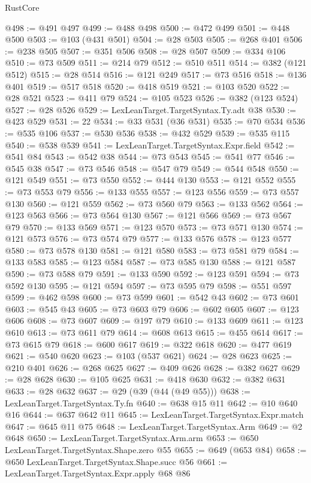 \begin{lexlean}{RustCore}
\begin{coremodule}
@498 := @491 @497
@499 := @488 @498
@500 := @472 @499
@501 := @448 @500
@503 := @103 (@431 @501)
@504 := @28 @503
@505 := @268 @401
@506 := @238 @505
@507 := @351 @506
@508 := @28 @507
@509 := @334 @106
@510 := @73 @509
@511 := @214 @79
@512 := @510 @511
@514 := @382 (@121 @512)
@515 := @28 @514
@516 := @121 @249
@517 := @73 @516
@518 := @136 @401
@519 := @517 @518
@520 := @418 @519
@521 := @103 @520
@522 := @28 @521
@523 := @411 @79
@524 := @105 @523
@526 := @382 (@123 @524)
@527 := @28 @526
@529 := LexLeanTarget.TargetSyntax.Ty.adt @38
@530 := @423 @529
@531 := 22
@534 := @33 @531 (@36 @531)
@535 := @70 @534
@536 := @535 @106
@537 := @530 @536
@538 := @432 @529
@539 := @535 @115
@540 := @538 @539
@541 := LexLeanTarget.TargetSyntax.Expr.field
@542 := @541 @84
@543 := @542 @38
@544 := @73 @543
@545 := @541 @77
@546 := @545 @38
@547 := @73 @546
@548 := @547 @79
@549 := @544 @548
@550 := @121 @549
@551 := @73 @550
@552 := @444 @130
@553 := @121 @552
@555 := @73 @553 @79
@556 := @133 @555
@557 := @123 @556
@559 := @73 @557 @130
@560 := @121 @559
@562 := @73 @560 @79
@563 := @133 @562
@564 := @123 @563
@566 := @73 @564 @130
@567 := @121 @566
@569 := @73 @567 @79
@570 := @133 @569
@571 := @123 @570
@573 := @73 @571 @130
@574 := @121 @573
@576 := @73 @574 @79
@577 := @133 @576
@578 := @123 @577
@580 := @73 @578 @130
@581 := @121 @580
@583 := @73 @581 @79
@584 := @133 @583
@585 := @123 @584
@587 := @73 @585 @130
@588 := @121 @587
@590 := @73 @588 @79
@591 := @133 @590
@592 := @123 @591
@594 := @73 @592 @130
@595 := @121 @594
@597 := @73 @595 @79
@598 := @551 @597
@599 := @462 @598
@600 := @73 @599
@601 := @542 @43
@602 := @73 @601
@603 := @545 @43
@605 := @73 @603 @79
@606 := @602 @605
@607 := @123 @606
@608 := @73 @607
@609 := @197 @79
@610 := @133 @609
@611 := @123 @610
@613 := @73 @611 @79
@614 := @608 @613
@615 := @455 @614
@617 := @73 @615 @79
@618 := @600 @617
@619 := @322 @618
@620 := @477 @619
@621 := @540 @620
@623 := @103 (@537 @621)
@624 := @28 @623
@625 := @210 @401
@626 := @268 @625
@627 := @409 @626
@628 := @382 @627
@629 := @28 @628
@630 := @105 @625
@631 := @418 @630
@632 := @382 @631
@633 := @28 @632
@637 := @29 (@39 (@44 (@49 @55)))
@638 := LexLeanTarget.TargetSyntax.Ty.fn
@640 := @638 @15 @11
@642 := @10 @640 @16
@644 := @637 @642 @11
@645 := LexLeanTarget.TargetSyntax.Expr.match
@647 := @645 @11 @75
@648 := LexLeanTarget.TargetSyntax.Arm
@649 := @2 @648
@650 := LexLeanTarget.TargetSyntax.Arm.arm
@653 := @650 LexLeanTarget.TargetSyntax.Shape.zero @55
@655 := @649 (@653 @84)
@658 := @650 LexLeanTarget.TargetSyntax.Shape.succ @56
@661 := LexLeanTarget.TargetSyntax.Expr.apply @68 @86

\end{coremodule}
\end{lexlean}
